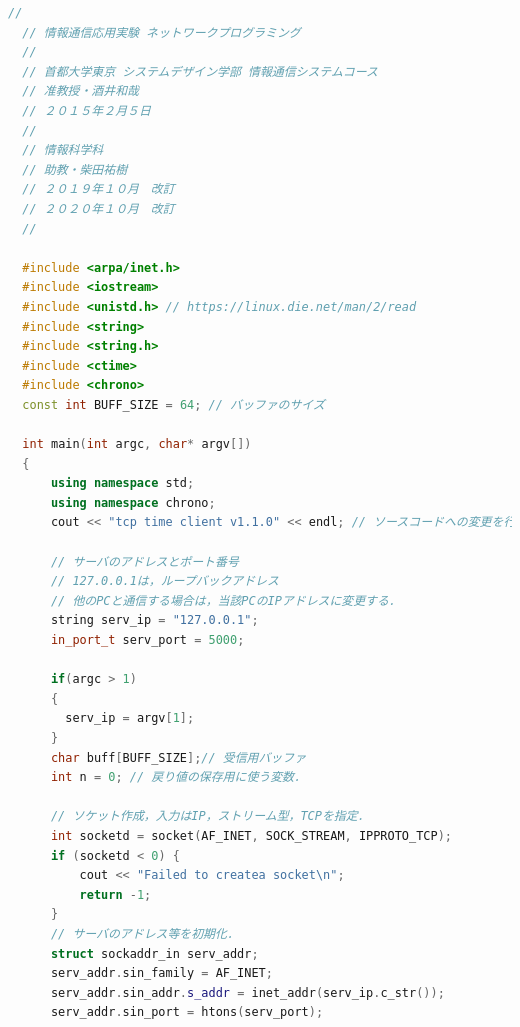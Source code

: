 \documentclass[fleqn, a4paper. 12pt]{ltjsarticle}
\begin{document}
\begin{lstlisting}[language=C++]
  //
  // 情報通信応用実験 ネットワークプログラミング
  //
  // 首都大学東京 システムデザイン学部 情報通信システムコース
  // 准教授・酒井和哉
  // ２０１５年２月５日
  //
  // 情報科学科
  // 助教・柴田祐樹
  // ２０１９年１０月　改訂
  // ２０２０年１０月　改訂
  //
  
  #include <arpa/inet.h>
  #include <iostream>
  #include <unistd.h> // https://linux.die.net/man/2/read
  #include <string>
  #include <string.h>
  #include <ctime>
  #include <chrono>
  const int BUFF_SIZE = 64; // バッファのサイズ
  
  int main(int argc, char* argv[])
  {
      using namespace std;
      using namespace chrono;
      cout << "tcp time client v1.1.0" << endl; // ソースコードへの変更を行ったら数値を変える．
  
      // サーバのアドレスとポート番号
      // 127.0.0.1は，ループバックアドレス
      // 他のPCと通信する場合は，当該PCのIPアドレスに変更する．
      string serv_ip = "127.0.0.1";
      in_port_t serv_port = 5000;
      
      if(argc > 1)
      {
        serv_ip = argv[1];
      }
      char buff[BUFF_SIZE];// 受信用バッファ
      int n = 0; // 戻り値の保存用に使う変数．
  
      // ソケット作成，入力はIP，ストリーム型，TCPを指定．
      int socketd = socket(AF_INET, SOCK_STREAM, IPPROTO_TCP);
      if (socketd < 0) {
          cout << "Failed to createa socket\n";
          return -1;
      }
      // サーバのアドレス等を初期化．
      struct sockaddr_in serv_addr;
      serv_addr.sin_family = AF_INET;
      serv_addr.sin_addr.s_addr = inet_addr(serv_ip.c_str());
      serv_addr.sin_port = htons(serv_port);
  

\end{lstlisting}
\end{document}
